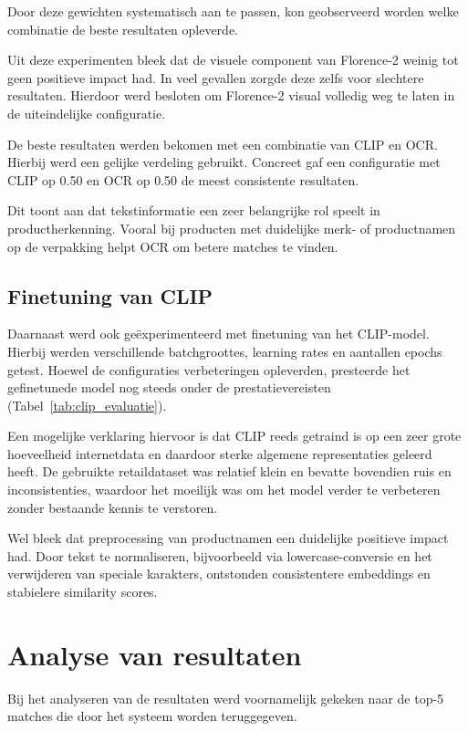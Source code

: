 Door deze gewichten systematisch aan te passen, kon geobserveerd worden welke combinatie de beste resultaten opleverde.

Uit deze experimenten bleek dat de visuele component van Florence-2 weinig tot geen positieve impact had. In veel gevallen zorgde deze zelfs voor slechtere resultaten. Hierdoor werd besloten om Florence-2 visual volledig weg te laten in de uiteindelijke configuratie.

De beste resultaten werden bekomen met een combinatie van CLIP en OCR. Hierbij werd een gelijke verdeling gebruikt. Concreet gaf een configuratie met CLIP op 0.50 en OCR op 0.50 de meest consistente resultaten.

Dit toont aan dat tekstinformatie een zeer belangrijke rol speelt in productherkenning. Vooral bij producten met duidelijke merk- of productnamen op de verpakking helpt OCR om betere matches te vinden.

\subsection{Finetuning van CLIP}
\label{sec:finetuning_clip}

Daarnaast werd ook geëxperimenteerd met finetuning van het CLIP-model. Hierbij werden verschillende batchgroottes, learning rates en aantallen epochs getest. Hoewel de configuraties verbeteringen opleverden, presteerde het gefinetunede model nog steeds onder de prestatievereisten (Tabel~\ref{tab:clip_evaluatie}).

Een mogelijke verklaring hiervoor is dat CLIP reeds getraind is op een zeer grote hoeveelheid internetdata en daardoor sterke algemene representaties geleerd heeft. De gebruikte retaildataset was relatief klein en bevatte bovendien ruis en inconsistenties, waardoor het moeilijk was om het model verder te verbeteren zonder bestaande kennis te verstoren.

Wel bleek dat preprocessing van productnamen een duidelijke positieve impact had. Door tekst te normaliseren, bijvoorbeeld via lowercase-conversie en het verwijderen van speciale karakters, ontstonden consistentere embeddings en stabielere similarity scores.

\section{Analyse van resultaten}
\label{sec:analyse_resultaten}

Bij het analyseren van de resultaten werd voornamelijk gekeken naar de top-5 matches die door het systeem worden teruggegeven.

